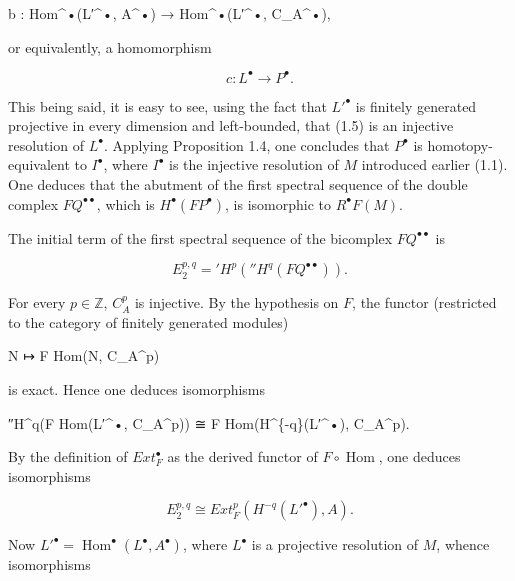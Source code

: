 \documentclass[
  11pt,
  a4paper,
]{book}
\newenvironment{Shaded}{}{}
\newcommand{\NormalTok}[1]{#1}
\begin{document}
\begin{Shaded}
\begin{Highlighting}[]
\NormalTok{b : Hom\^{}•(L′\^{}•, A\^{}•) → Hom\^{}•(L′\^{}•, C\_A\^{}•),}
\end{Highlighting}
\end{Shaded}

or equivalently, a homomorphism

\[ c : L^{\bullet} \to P^{\bullet}. \]

This being said, it is easy to see, using the fact that \(L'^{\bullet}\)
is finitely generated projective in every dimension and left-bounded,
that (1.5) is an injective resolution of \(L^{\bullet}\). Applying
Proposition 1.4, one concludes that \(P^{\bullet}\) is
homotopy-equivalent to \(I^{\bullet}\), where \(I^{\bullet}\) is the
injective resolution of \(M\) introduced earlier (1.1). One deduces that
the abutment of the first spectral sequence of the double complex \(F
Q^{\bullet\bullet}\), which is \(H^{\bullet}(F P^{\bullet})\), is
isomorphic to \(R^{\bullet} F(M)\).

The initial term of the first spectral sequence of the bicomplex
\(F Q^{\bullet\bullet}\) is

\[ E^{p,q}_{2} = 'H^{p}(''H^{q}(F Q^{\bullet\bullet})). \]

For every \(p \in \mathbb{Z}\), \(C^{p}_{A}\) is injective. By the
hypothesis on \(F\), the functor (restricted to the category of finitely
generated modules)

\begin{Shaded}
\begin{Highlighting}[]
\NormalTok{N ↦ F Hom(N, C\_A\^{}p)}
\end{Highlighting}
\end{Shaded}

is exact. Hence one deduces isomorphisms

\begin{Shaded}
\begin{Highlighting}[]
\NormalTok{″H\^{}q(F Hom(L′\^{}•, C\_A\^{}p)) ≅ F Hom(H\^{}\{{-}q\}(L′\^{}•), C\_A\^{}p).}
\end{Highlighting}
\end{Shaded}

By the definition of \(Ext^{\bullet}_{F}\) as the derived functor of
\(F \circ \operatorname{Hom}\), one deduces isomorphisms

\[ E^{p,q}_{2} \cong Ext^{p}_{F}(H^{-q}(L'^{\bullet}), A). \]

Now
\(L'^{\bullet} = \operatorname{Hom}^{\bullet}(L^{\bullet}, A^{\bullet})\),
where \(L^{\bullet}\) is a projective resolution of \(M\), whence
isomorphisms
\end{document}
